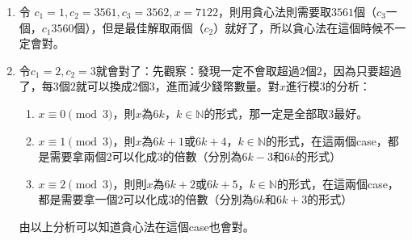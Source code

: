 {\begin{enumerate}
				用數學歸納法：假設一個由$c_1 = 1$的錢幣的和大於或等於$c_2$，則答案顯然：選$c_2$個不就得了！那假設一堆比$c_{i}$小的錢幣加起來超過$c_{i}$，且一定可以選擇那些錢幣使得和等於$c_i$。那看$c_{i + 1}$：它有兩種可能：因為$c_i | c_{i +1}$，所以可能全部由$c_{i}$組成，也可能不是。分這兩個case討論：
				\begin{enumerate}
					\item  全部由$c_i$組成，則顯然可以：選$\frac{c_{i + 1}}{c_i}$個就好了！
					\item 假設由$x$（$x \leq \frac{c_{i + 1}}{c_i} - 1$） 個$c_i$和其他的，比$c_i$小的錢幣，令其和為$S$。因為$c_i | c_{i + 1}$且$S + x \cdot c_i = c_{i + 1}$所以
					$$c_{i + 1} = S + x \cdot c_i \leq S + c_{i + 1} - c_{i} \implies S \geq c_i$$
					那因為以上的假設，我就可以取一些化簡成$c_i$，而$x$變成$x + 1$。若其依然符合$x \leq \frac{c_{i + 1}}{c_i} - 1$，那就繼續取，直到$x = \frac{c_{i + 1}}{1}$，那就變成第一個case了，就直接取最大的。
				\end{enumerate}
			所以每次如果沒有取最大的，而是取其他的，一定有辦法合併成更好的解，而最後的合併就會變成貪心解，得證。
		\item 令
		$c_1 = 1, c_2 = 3561, c_3 = 3562, x = 7122$，則用貪心法則需要取$3561$個（$c_3$一個，$c_1$$3560$個），但是最佳解取兩個（$c_2$）就好了，所以貪心法在這個時候不一定會對。
		\item  令$c_1 = 2, c_2 = 3$就會對了：先觀察：發現一定不會取超過$2$個$2$，因為只要超過了，每$3$個$2$就可以換成$2$個$3$，進而減少錢幣數量。對$x$進行模$3$的分析：
			\begin{enumerate}
				\item $x \equiv 0 \pmod{3}$，則$x$為$6k$，$k \in \mathbb{N}$的形式，那一定是全部取3最好。
				\item $x \equiv 1 \pmod{3}$，則$x$為$6k + 1$或$6k + 4$，$k \in \mathbb{N}$的形式，在這兩個case，都是需要拿兩個$2$可以化成$3$的倍數（分別為$6k - 3$和$6k$的形式）
				\item  $x \equiv 2 \pmod{3}$，則則$x$為$6k + 2$或$6k + 5$，$k \in \mathbb{N}$的形式，在這兩個case，都是需要拿一個$2$可以化成$3$的倍數（分別為$6k $和$6k + 3$的形式）
			\end{enumerate}
		由以上分析可以知道貪心法在這個case也會對。
	\end{enumerate}
}

